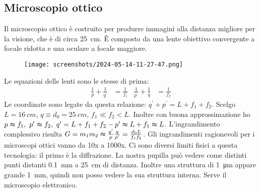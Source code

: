\subsection{Microscopio ottico}
Il microscopio ottico è costruito per produrre immagini alla distanza migliore per la visione, che è di circa \SI{25}{cm}. È composto da una lente obiettivo convergente a focale ridotta e una oculare a focale maggiore.
\begin{figure}[H]
	\centering
	\texttt{[image: screenshots/2024-05-14-11-27-47.png]}
\end{figure}
Le equazioni delle lenti sono le stesse di prima:
\begin{align}
	\frac{1}{p} + \frac{1}{q^{\prime} } &= \frac{1}{f_1}
	&
	\frac{1}{p^{\prime} } + \frac{1}{q} &= \frac{1}{f_2}
\end{align}
Le coordinate sono legate da questa relazione: \(q^{\prime} + p^{\prime} = L + f_1 + f_2\). Scelgo \(L= \SI{16}{cm} \), \(q\equiv d_0 = \SI{25}{cm} \), \(f_1 \ll f_2 < L\). Inoltre con buona approssimazione ho \(p\thickapprox f_1,\ p^{\prime} \thickapprox f_2,\ q^{\prime} =L+f_1 +f_2 -p^{\prime} \thickapprox L + f_1 \thickapprox L\). L'ingrandimento complessivo risulta \(G=m_1 m_2 \thickapprox \frac{q^{\prime} }{p} \frac{q}{p^{\prime} } = \frac{d_0 L}{f_1 f_2}\). Gli ingrandimenti ragionevoli per i microscopi ottici vanno da 10x a 1000x. Ci sono diversi limiti fisici a questa tecnologia: il primo è la diffrazione. La nostra pupilla può vedere come distinti punti distanti \SI{0.1}{mm} a \SI{25}{cm} di distanza. Inoltre una struttura di \SI{1}{\micro \metre} appare grande \SI{1}{mm}, quindi non posso vedere la sua struttura interna. Serve il microscopio elettronico.

